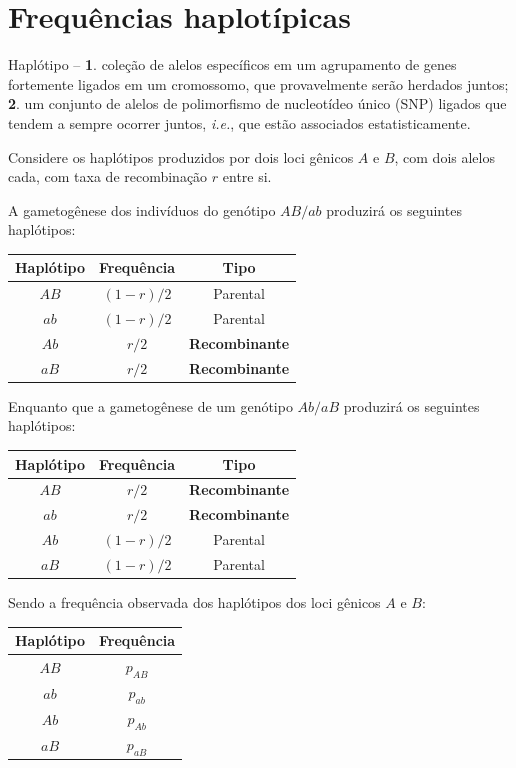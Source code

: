 \documentclass[
]{book}
\begin{document}
\hypertarget{frequuxeancias-haplotuxedpicas}{%
\section{Frequências haplotípicas}\label{frequuxeancias-haplotuxedpicas}}

Haplótipo -- \textbf{1}. coleção de alelos específicos em um agrupamento de genes fortemente ligados em um cromossomo, que provavelmente serão herdados juntos; \textbf{2}. um conjunto de alelos de polimorfismo de nucleotídeo único (SNP) ligados que tendem a sempre ocorrer juntos, \emph{i.e.}, que estão associados estatisticamente.

Considere os haplótipos produzidos por dois loci gênicos \(A\) e \(B\), com dois alelos cada, com taxa de recombinação \(r\) entre si.

A gametogênese dos indivíduos do genótipo \(AB/ab\) produzirá os seguintes haplótipos:

\begin{longtable}[]{@{}ccc@{}}
\toprule()
Haplótipo & Frequência & Tipo \\
\midrule()
\endhead
\(AB\) & \((1-r)/2\) & Parental \\
\(ab\) & \((1-r)/2\) & Parental \\
\(Ab\) & \(r/2\) & \textbf{Recombinante} \\
\(aB\) & \(r/2\) & \textbf{Recombinante} \\
\bottomrule()
\end{longtable}

Enquanto que a gametogênese de um genótipo \(Ab/aB\) produzirá os seguintes haplótipos:

\begin{longtable}[]{@{}ccc@{}}
\toprule()
Haplótipo & Frequência & Tipo \\
\midrule()
\endhead
\(AB\) & \(r/2\) & \textbf{Recombinante} \\
\(ab\) & \(r/2\) & \textbf{Recombinante} \\
\(Ab\) & \((1-r)/2\) & Parental \\
\(aB\) & \((1-r)/2\) & Parental \\
\bottomrule()
\end{longtable}

Sendo a frequência observada dos haplótipos dos loci gênicos \(A\) e \(B\):

\begin{longtable}[]{@{}cc@{}}
\toprule()
Haplótipo & Frequência \\
\midrule()
\endhead
\(AB\) & \(p_{AB}\) \\
\(ab\) & \(p_{ab}\) \\
\(Ab\) & \(p_{Ab}\) \\
\(aB\) & \(p_{aB}\) \\
\bottomrule()
\end{longtable}
\end{document}
